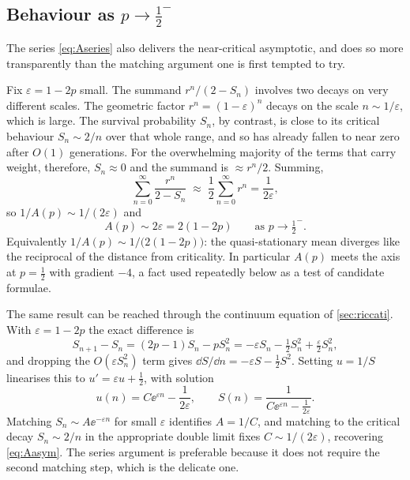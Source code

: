 \subsection{Behaviour as \texorpdfstring{$p\to\tfrac12^-$}{p to 1/2}}
\label{sec:asymptotic}

The series \cref{eq:Aseries} also delivers the near-critical asymptotic, and does so
more transparently than the matching argument one is first tempted to try.

Fix $\varepsilon = 1-2p$ small. The summand $r^n/(2-S_n)$ involves two decays on very
different scales. The geometric factor $r^n = (1-\varepsilon)^n$ decays on the scale
$n\sim1/\varepsilon$, which is large. The survival probability $S_n$, by contrast, is
close to its critical behaviour $S_n\sim2/n$ over that whole range, and so has
already fallen to near zero after $O(1)$ generations. For the overwhelming majority
of the terms that carry weight, therefore, $S_n\approx0$ and the summand is
$\approx r^n/2$. Summing,
\begin{equation*}
\sum_{n=0}^{\infty}\frac{r^n}{2-S_n} \;\approx\; \frac12\sum_{n=0}^{\infty}r^n = \frac{1}{2\varepsilon},
\end{equation*}
so $1/A(p)\sim 1/(2\varepsilon)$ and
\begin{equation}
\label{eq:Aasym}
\boxed{\;A(p) \sim 2\varepsilon = 2(1-2p)\qquad\text{as } p\to\tfrac12^-.\;}
\end{equation}
Equivalently $1/A(p)\sim 1/\bigl(2(1-2p)\bigr)$: the quasi-stationary mean diverges
like the reciprocal of the distance from criticality. In particular $A(p)$ meets the
axis at $p=\tfrac12$ with gradient $-4$, a fact used repeatedly below as a test of
candidate formulae.

The same result can be reached through the continuum equation of \cref{sec:riccati}.
With $\varepsilon = 1-2p$ the exact difference is
\begin{equation*}
S_{n+1}-S_n = (2p-1)S_n - pS_n^2 = -\varepsilon S_n - \tfrac12 S_n^2 + \tfrac{\varepsilon}{2}S_n^2 ,
\end{equation*}
and dropping the $O(\varepsilon S_n^2)$ term gives
$\dd S/\dd n = -\varepsilon S - \tfrac12 S^2$. Setting $u = 1/S$ linearises this to
$u' = \varepsilon u + \tfrac12$, with solution
\begin{equation*}
u(n) = C\ee^{\varepsilon n} - \frac{1}{2\varepsilon},
\qquad
S(n) = \frac{1}{C\ee^{\varepsilon n} - \frac{1}{2\varepsilon}} .
\end{equation*}
Matching $S_n\sim A\ee^{-\varepsilon n}$ for small $\varepsilon$ identifies
$A = 1/C$, and matching to the critical decay $S_n\sim2/n$ in the appropriate double
limit fixes $C\sim1/(2\varepsilon)$, recovering \cref{eq:Aasym}. The series argument
is preferable because it does not require the second matching step, which is the
delicate one.

